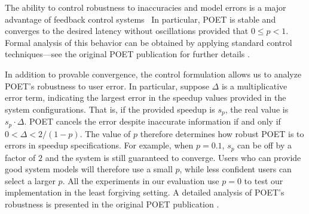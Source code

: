 The ability to control robustness to inaccuracies and model errors is a major advantage of feedback control systems~\cite{ICSE2014}
In particular, POET is stable and converges to the desired latency without oscillations provided that $0 \le p < 1$.
Formal analysis of this behavior can be obtained by applying standard control techniques---see the original POET publication for further details \cite{POET}.

In addition to provable convergence, the control formulation allows us to analyze POET's robustness to user error.
In particular, suppose $\Delta$ is a multiplicative error term, indicating the largest error in the speedup values provided in the system configurations.
That is, if the provided speedup is $s_p$, the real value is $s_p \cdot \Delta$.
POET cancels the error despite inaccurate information if and only if $0 < \Delta < 2/(1-p)$.
The value of $p$ therefore determines how robust POET is to errors in speedup specifications.
For example, when $p = 0.1$, $s_p$ can be off by a factor of $2$ and the system is still guaranteed to converge.
Users who can provide good system models will therefore use a small $p$, while less confident users can select a larger $p$.
All the experiments in our evaluation use $p=0$ to test our implementation in the least forgiving setting.
A detailed analysis of POET's robustness is presented in the original POET publication \cite{POET}.
